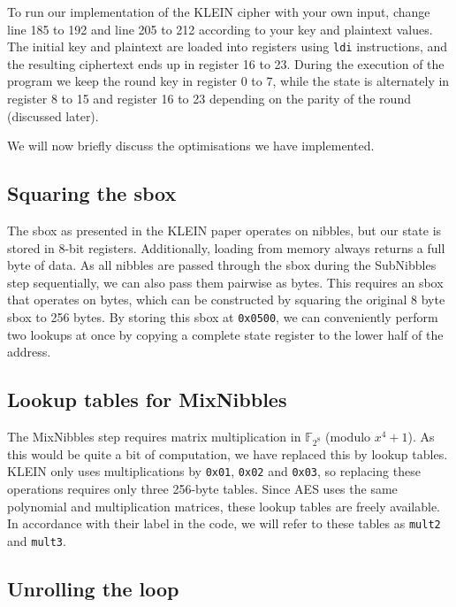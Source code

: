 \documentclass[a4paper]{article}
\begin{document}
To run our implementation of the KLEIN cipher with your own input, change line 185 to 192 and line 205 to 212 according to your key and plaintext values. The initial key and plaintext are loaded into registers using \texttt{ldi} instructions, and the resulting ciphertext ends up in register 16 to 23. During the execution of the program we keep the round key in register 0 to 7, while the state is alternately in register 8 to 15 and register 16 to 23 depending on the parity of the round (discussed later).

We will now briefly discuss the optimisations we have implemented.


\subsection*{Squaring the sbox}

The sbox as presented in the KLEIN paper operates on nibbles, but our state is stored in 8-bit registers. Additionally, loading from memory always returns a full byte of data. As all nibbles are passed through the sbox during the SubNibbles step sequentially, we can also pass them pairwise as bytes. This requires an sbox that operates on bytes, which can be constructed by squaring the original 8 byte sbox to 256 bytes. By storing this sbox at \texttt{0x0500}, we can conveniently perform two lookups at once by copying a complete state register to the lower half of the address.

\subsection*{Lookup tables for MixNibbles}

The MixNibbles step requires matrix multiplication in $\mathbb{F}_{2^8}$ (modulo $x^4 + 1$). As this would be quite a bit of computation, we have replaced this by lookup tables. KLEIN only uses multiplications by \texttt{0x01}, \texttt{0x02} and \texttt{0x03}, so replacing these operations requires only three 256-byte tables. Since AES uses the same polynomial and multiplication matrices, these lookup tables are freely available. In accordance with their label in the code, we will refer to these tables as \texttt{mult2} and \texttt{mult3}.

\subsection*{Unrolling the loop}
\end{document}
